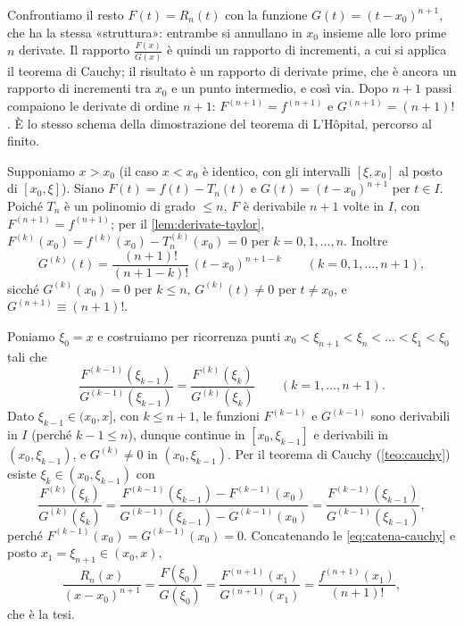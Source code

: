 \begin{schema}
\end{schema}

\begin{strategia}
Confrontiamo il resto $F(t)=R_{n}(t)$ con la funzione $G(t)=(t-x_{0})^{n+1}$, che ha la
stessa «struttura»: entrambe si annullano in $x_{0}$ insieme alle loro prime $n$
derivate. Il rapporto $\frac{F(x)}{G(x)}$ è quindi un rapporto di incrementi, a cui si applica il
teorema di Cauchy; il risultato è un rapporto di derivate prime, che è ancora un
rapporto di incrementi tra $x_{0}$ e un punto intermedio, e così via. Dopo $n+1$ passi
compaiono le derivate di ordine $n+1$: $F^{(n+1)}=f^{(n+1)}$ e $G^{(n+1)}=(n+1)!$. È lo
stesso schema della dimostrazione del teorema di L'Hôpital, percorso al finito.
\end{strategia}

\begin{dimostrazione}
Supponiamo $x>x_{0}$ (il caso $x<x_{0}$ è identico, con gli intervalli $[\xi,x_{0}]$ al posto
di $[x_{0},\xi]$). Siano $F(t)=f(t)-T_{n}(t)$ e $G(t)=(t-x_{0})^{n+1}$ per $t\in I$. Poiché $T_{n}$ è
un polinomio di grado $\le n$, $F$ è derivabile $n+1$ volte in $I$, con
$F^{(n+1)}=f^{(n+1)}$; per il \cref{lem:derivate-taylor},
$F^{(k)}(x_{0})=f^{(k)}(x_{0})-T_{n}^{(k)}(x_{0})=0$ per $k=0,1,\dots,n$. Inoltre
\[
  G^{(k)}(t)=\frac{(n+1)!}{(n+1-k)!}\,(t-x_{0})^{n+1-k} \qquad (k=0,1,\dots,n+1),
\]
sicché $G^{(k)}(x_{0})=0$ per $k\le n$, $G^{(k)}(t)\neq0$ per $t\neq x_{0}$, e $G^{(n+1)}\equiv(n+1)!$.

Poniamo $\xi_{0}=x$ e costruiamo per ricorrenza punti $x_{0}<\xi_{n+1}<\xi_{n}<\dots<\xi_{1}<\xi_{0}$ tali
che
\begin{equation}\label{eq:catena-cauchy}
  \frac{F^{(k-1)}(\xi_{k-1})}{G^{(k-1)}(\xi_{k-1})}=\frac{F^{(k)}(\xi_{k})}{G^{(k)}(\xi_{k})} \qquad (k=1,\dots,n+1) .
\end{equation}
Dato $\xi_{k-1}\in(x_{0},x]$, con $k\le n+1$, le funzioni $F^{(k-1)}$ e $G^{(k-1)}$ sono derivabili in
$I$ (perché $k-1\le n$), dunque continue in $[x_{0},\xi_{k-1}]$ e derivabili in $(x_{0},\xi_{k-1})$, e
$G^{(k)}\neq0$ in $(x_{0},\xi_{k-1})$. Per il teorema di Cauchy (\cref{teo:cauchy}) esiste
$\xi_{k}\in(x_{0},\xi_{k-1})$ con
\[
  \frac{F^{(k)}(\xi_{k})}{G^{(k)}(\xi_{k})}=\frac{F^{(k-1)}(\xi_{k-1})-F^{(k-1)}(x_{0})}{G^{(k-1)}(\xi_{k-1})-G^{(k-1)}(x_{0})}
  =\frac{F^{(k-1)}(\xi_{k-1})}{G^{(k-1)}(\xi_{k-1})} ,
\]
perché $F^{(k-1)}(x_{0})=G^{(k-1)}(x_{0})=0$. Concatenando le \eqref{eq:catena-cauchy} e posto
$x_{1}=\xi_{n+1}\in(x_{0},x)$,
\[
  \frac{R_{n}(x)}{(x-x_{0})^{n+1}}=\frac{F(\xi_{0})}{G(\xi_{0})}=\frac{F^{(n+1)}(x_{1})}{G^{(n+1)}(x_{1})}
  =\frac{f^{(n+1)}(x_{1})}{(n+1)!} ,
\]
che è la tesi.
\end{dimostrazione}

